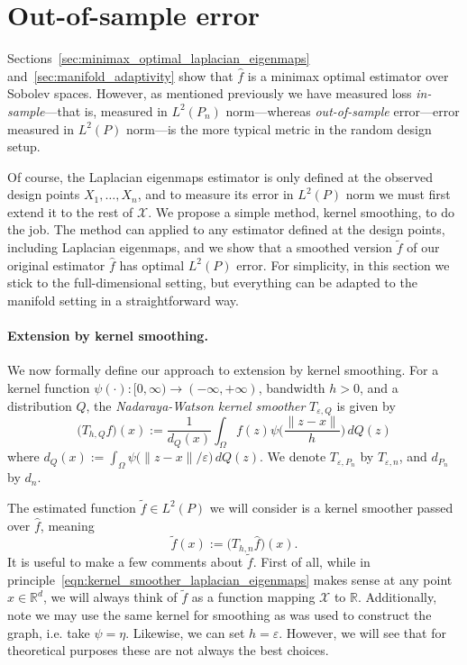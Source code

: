 \documentclass{article}
\newcommand{\Reals}{\mathbb{R}}
\newcommand{\1}{\mathbf{1}}
\newcommand{\Rd}{\Reals^d}
\newcommand{\Xset}{\mathcal{X}}
\newcommand{\Leb}{L}
\newcommand{\mc}[1]{\mathcal{#1}}
\newcommand{\wt}[1]{\widetilde{#1}}
\newcommand{\wh}[1]{\widehat{#1}}
\theoremstyle{alden}
\theoremstyle{aldenthm}
\theoremstyle{definition}
\theoremstyle{remark}
\begin{document}
\section{Out-of-sample error}
\label{sec:out_of_sample}
Sections~\ref{sec:minimax_optimal_laplacian_eigenmaps} and~\ref{sec:manifold_adaptivity} show that $\wh{f}$ is a minimax optimal estimator over Sobolev spaces. However, as mentioned previously we have measured loss \emph{in-sample}---that is, measured in $\Leb^2(P_n)$ norm---whereas \emph{out-of-sample} error---error measured in $L^2(P)$ norm---is the more typical metric in the random design setup.

Of course, the Laplacian eigenmaps estimator is only defined at the observed design points $X_1,\ldots,X_n$, and to measure its error in $L^2(P)$ norm we must first extend it to the rest of $\Xset$. We propose a simple method, kernel smoothing, to do the job. The method can applied to any estimator defined at the design points, including Laplacian eigenmaps, and we show that a smoothed version $\wt{f}$ of our original estimator $\wh{f}$ has optimal $L^2(P)$ error. For simplicity, in this section we stick to the full-dimensional setting, but everything can be adapted to the manifold setting in a straightforward way.

\paragraph{Extension by kernel smoothing.}
We now formally define our approach to extension by kernel smoothing. For a kernel function $\psi(\cdot): [0,\infty) \to (-\infty,+\infty)$, bandwidth $h > 0$, and a distribution $Q$, the \emph{Nadaraya-Watson kernel smoother} $T_{\varepsilon,Q}$ is given by
\begin{equation*}
\bigl(T_{h,Q}f)(x) := \frac{1}{d_Q(x)} \int_{\Omega} f(z)\psi\biggl(\frac{\|z - x\|}{h}\biggr) \,dQ(z)
\end{equation*}
where $d_Q(x) := \int_{\Omega} \psi\bigl(\|z - x\|/\varepsilon\bigr) \,dQ(z)$. We denote $T_{\varepsilon,P_n}$ by $T_{\varepsilon,n}$, and $d_{P_n}$ by $d_n$. 

The estimated function $\wt{f} \in L^2(P)$ we will consider is a kernel smoother passed over $\wh{f}$, meaning
\begin{equation}
\label{eqn:kernel_smoother_laplacian_eigenmaps}
\wt{f}(x) := \bigl(T_{h,n}\wh{f}\bigr)(x).
\end{equation}
It is useful to make a few comments about $\wt{f}$. First of all, while in principle~\eqref{eqn:kernel_smoother_laplacian_eigenmaps} makes sense at any point $x \in \Rd$, we will always think of $\wt{f}$ as a function mapping $\mc{X}$ to $\Reals$. Additionally, note we may use the same kernel for smoothing as was used to construct the graph, i.e. take $\psi = \eta$. Likewise, we can set $h = \varepsilon$. However, we will see that for theoretical purposes these are not always the best choices. 
\end{document}
